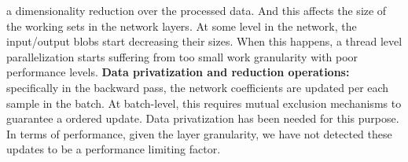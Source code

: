 a dimensionality reduction over the processed data.
And this affects the size of the working sets in the network layers.
At some level in the network, the input/output blobs start decreasing their sizes. When this happens, a thread level parallelization
starts suffering from too small work granularity with poor performance levels.
\textbf{Data privatization and reduction operations:} specifically in the
backward pass, the network coefficients are updated per each
sample in the batch. At batch-level, this requires mutual exclusion
mechanisms to guarantee a ordered update. Data privatization has
been needed for this purpose. In terms of performance, given the 
layer granularity, we have not detected these updates to be a 
performance limiting factor.


